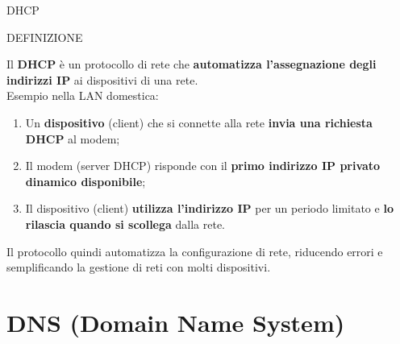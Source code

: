 \documentclass[aspectratio=1610, handout]{beamer}
\begin{document}
\begin{frame}{DHCP}
    \begin{alertblock}{DEFINIZIONE}
        \begin{minipage}{0.98\linewidth}
            \justifying
            Il \textbf{DHCP} è un protocollo di rete che \textbf{automatizza l'assegnazione degli indirizzi IP} ai 
            dispositivi di una rete.\\
            \bigskip
            Esempio nella LAN domestica:            
            \begin{enumerate}
                \pause
                \item Un \textbf{dispositivo} (client) che si connette alla rete \textbf{invia una richiesta DHCP} al modem;
                \pause
                \item Il modem (server DHCP) risponde con il \textbf{primo indirizzo IP privato dinamico disponibile};
                \pause
                \item  Il dispositivo (client) \textbf{utilizza l'indirizzo IP} per un periodo limitato e \textbf{lo rilascia
                quando si scollega} dalla rete.
            \end{enumerate}            
            Il protocollo quindi automatizza la configurazione di rete, riducendo errori e semplificando la 
            gestione di reti con molti dispositivi.
        \end{minipage}
    \end{alertblock}
\end{frame}

\section{DNS (Domain Name System)}
\end{document}
